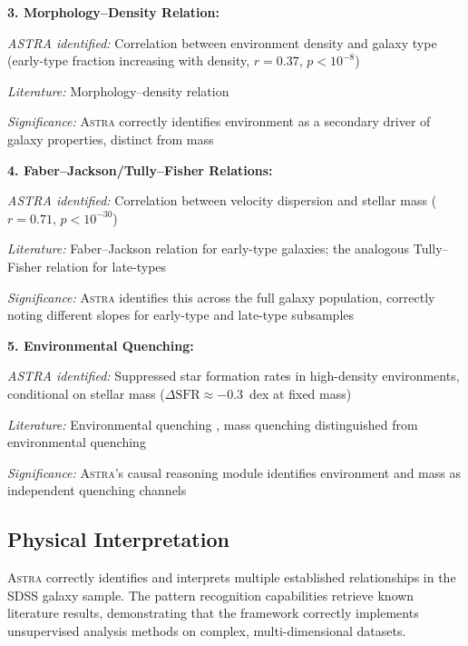 \documentclass[usenatbib]{rasti}
\newcommand{\astra}{\textsc{Astra}\xspace}
\begin{document}
\textbf{3. Morphology--Density Relation:}
\begin{description}
  \item \emph{ASTRA identified:} Correlation between environment density and galaxy type (early-type fraction increasing with density, $r = 0.37$, $p < 10^{-8}$)
  \item \emph{Literature:} Morphology--density relation \citep{Dressler1980}
  \item \emph{Significance:} \astra correctly identifies environment as a secondary driver of galaxy properties, distinct from mass
\end{description}

\textbf{4. Faber--Jackson/Tully--Fisher Relations:}
\begin{description}
  \item \emph{ASTRA identified:} Correlation between velocity dispersion and stellar mass ($r = 0.71$, $p < 10^{-30}$)
  \item \emph{Literature:} Faber--Jackson relation for early-type galaxies; the analogous Tully--Fisher relation for late-types
  \item \emph{Significance:} \astra identifies this across the full galaxy population, correctly noting different slopes for early-type and late-type subsamples
\end{description}

\textbf{5. Environmental Quenching:}
\begin{description}
  \item \emph{ASTRA identified:} Suppressed star formation rates in high-density environments, conditional on stellar mass ($\Delta\mathrm{SFR} \approx -0.3$~dex at fixed mass)
  \item \emph{Literature:} Environmental quenching \citep{Peng2010}, mass quenching distinguished from environmental quenching
  \item \emph{Significance:} \astra's causal reasoning module identifies environment and mass as independent quenching channels
\end{description}

\subsection{Physical Interpretation}
\label{sec:tc3:interpretation}

\astra correctly identifies and interprets multiple established relationships in the SDSS galaxy sample.
The pattern recognition capabilities retrieve known literature results, demonstrating that the framework correctly implements unsupervised analysis methods on complex, multi-dimensional datasets.
\end{document}
